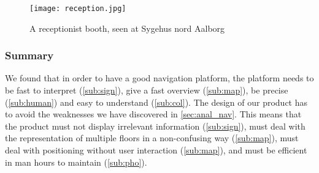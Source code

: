   \begin{figure}[ht!]
    \centering
    \texttt{[image: reception.jpg]}
    \caption{A receptionist booth, seen at Sygehus nord Aalborg}
    \label{fig:rec_booth}
  \end{figure}

\subsubsection{Summary} %
  We found that in order to have a good navigation platform, the platform needs to be fast to interpret (\cref{sub:sign}), give a fast overview (\cref{sub:map}), be precise (\cref{sub:human}) and easy to understand (\cref{sub:col}). The design of our product has to avoid the weaknesses we have discovered in \cref{sec:anal_nav}. This means that the product must not display irrelevant information (\cref{sub:sign}), must deal with the representation of multiple floors in a non-confusing way (\cref{sub:map}), must deal with positioning without user interaction (\cref{sub:map}), and must be efficient in man hours to maintain (\cref{sub:pho}).

